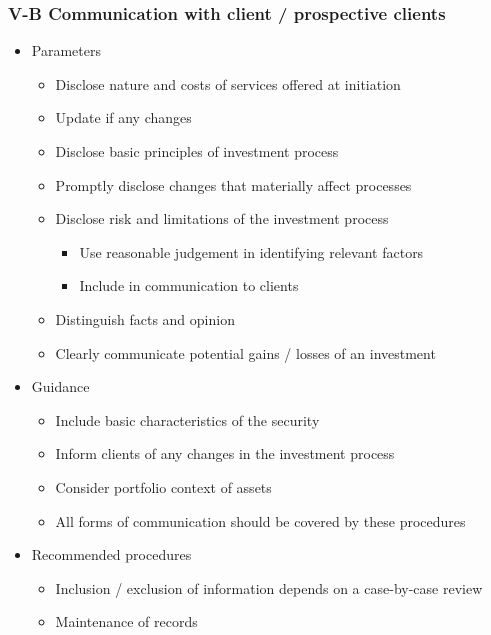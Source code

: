 \documentclass[../notes_compiled.tex]{subfiles}
\begin{document}
\subsubsection{V-B Communication with client / prospective clients}
\begin{itemize}
\item Parameters
\begin{itemize}
\item Disclose nature and costs of services offered at initiation
\item Update if any changes
\item Disclose basic principles of investment process
\item Promptly disclose changes that materially affect processes
\item Disclose risk and limitations of the investment process
\begin{itemize}
\item Use reasonable judgement in identifying relevant factors
\item Include in communication to clients
\end{itemize}
\item Distinguish facts and opinion
\item Clearly communicate potential gains / losses of an investment
\end{itemize}
\item Guidance
\begin{itemize}
\item Include basic characteristics of the security
\item Inform clients of any changes in the investment process
\item Consider portfolio context of assets
\item All forms of communication should be covered by these procedures
\end{itemize}
\item Recommended procedures
\begin{itemize}
\item Inclusion / exclusion of information depends on a case-by-case review
\item Maintenance of records
\end{itemize}
\end{itemize}
\end{document}
